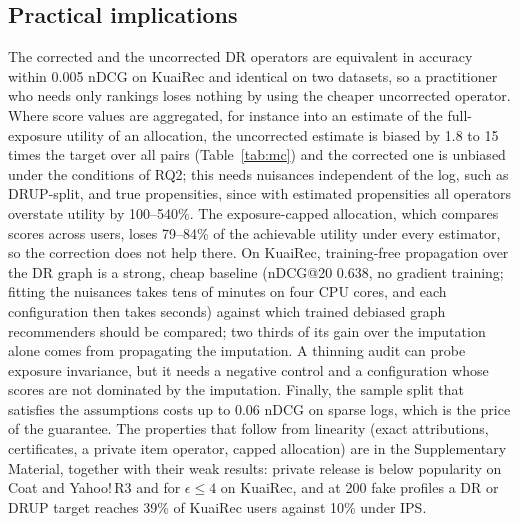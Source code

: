 \subsection{Practical implications}
The corrected and the uncorrected DR operators are equivalent in accuracy within
0.005 nDCG on KuaiRec and identical on two datasets, so a practitioner who needs only
rankings loses nothing by using the cheaper uncorrected operator. Where score values are
aggregated, for instance into an estimate of the full-exposure utility of an allocation,
the uncorrected estimate is biased by 1.8 to 15 times the target over all pairs
(Table~\ref{tab:mc}) and the corrected one is unbiased under the conditions of RQ2; this
needs nuisances independent of the log, such as DRUP-split, and true propensities, since
with estimated propensities all operators overstate utility by 100--540\%. The
exposure-capped allocation, which compares scores across users, loses 79--84\% of the
achievable utility under every estimator, so the correction does not help there. On
KuaiRec, training-free propagation over the DR graph is a strong, cheap baseline
(nDCG@20 0.638, no gradient training; fitting the nuisances takes tens of minutes on four CPU
cores, and each configuration then takes seconds) against which trained debiased graph recommenders should be compared;
two thirds of its gain over the imputation alone comes from propagating the imputation.
A thinning audit can probe exposure invariance, but it needs a negative control and a
configuration whose scores are not dominated by the imputation. Finally, the sample
split that satisfies the assumptions costs up to 0.06 nDCG on sparse logs, which is the
price of the guarantee. The properties that follow from linearity (exact attributions,
certificates, a private item operator, capped allocation) are in the Supplementary
Material, together with their weak results: private release is below popularity on
Coat and Yahoo!\,R3 and for $\epsilon\le4$ on KuaiRec, and at 200 fake profiles a DR or
DRUP target reaches 39\% of KuaiRec users against 10\% under IPS.

